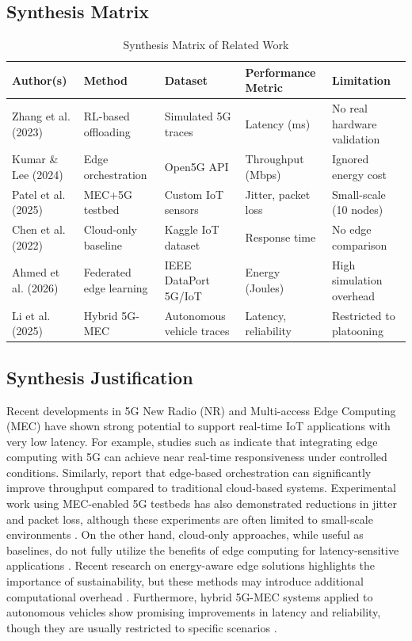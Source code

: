 \documentclass[12pt,a4paper]{article}
\begin{document}
\subsection{Synthesis Matrix}
\begin{table}[h]
\centering
\begin{tabular}{|p{2.8cm}|p{2.5cm}|p{2.8cm}|p{2.5cm}|p{3cm}|}
\hline
\textbf{Author(s)} & \textbf{Method} & \textbf{Dataset} & \textbf{Performance Metric} & \textbf{Limitation} \\
\hline
Zhang et al. (2023) \cite{zhang2023} & RL-based offloading & Simulated 5G traces & Latency (ms) & No real hardware validation \\
\hline
Kumar \& Lee (2024) \cite{kumar2024} & Edge orchestration & Open5G API & Throughput (Mbps) & Ignored energy cost \\
\hline
Patel et al. (2025) \cite{patel2025} & MEC+5G testbed & Custom IoT sensors & Jitter, packet loss & Small-scale (10 nodes) \\
\hline
Chen et al. (2022) \cite{chen2022} & Cloud-only baseline & Kaggle IoT dataset & Response time & No edge comparison \\
\hline
Ahmed et al. (2026) \cite{ahmed2026} & Federated edge learning & IEEE DataPort 5G/IoT & Energy (Joules) & High simulation overhead \\
\hline
Li et al. (2025) \cite{li2025} & Hybrid 5G-MEC & Autonomous vehicle traces & Latency, reliability & Restricted to platooning \\
\hline
\end{tabular}
\caption{Synthesis Matrix of Related Work}
\label{tab:synthesis}
\end{table}

\subsection{Synthesis Justification}
Recent developments in 5G New Radio (NR) and Multi-access Edge Computing (MEC) have shown strong potential to support real-time IoT applications with very low latency. For example, studies such as \cite{zhang2023} indicate that integrating edge computing with 5G can achieve near real-time responsiveness under controlled conditions. Similarly, \cite{kumar2024} report that edge-based orchestration can significantly improve throughput compared to traditional cloud-based systems. Experimental work using MEC-enabled 5G testbeds has also demonstrated reductions in jitter and packet loss, although these experiments are often limited to small-scale environments \cite{patel2025}. On the other hand, cloud-only approaches, while useful as baselines, do not fully utilize the benefits of edge computing for latency-sensitive applications \cite{chen2022}. Recent research on energy-aware edge solutions highlights the importance of sustainability, but these methods may introduce additional computational overhead \cite{ahmed2026}. Furthermore, hybrid 5G-MEC systems applied to autonomous vehicles show promising improvements in latency and reliability, though they are usually restricted to specific scenarios \cite{li2025}.
\end{document}

